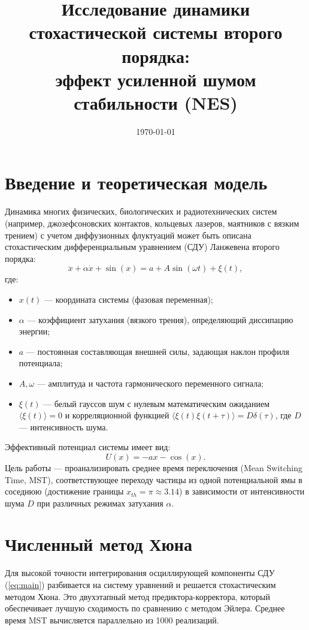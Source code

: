 \documentclass{article}
\title{Исследование динамики стохастической системы второго порядка:\\ эффект усиленной шумом стабильности (NES)}
\date{\today}
\begin{document}
\maketitle

\section{Введение и теоретическая модель}
Динамика многих физических, биологических и радиотехнических систем (например, джозефсоновских контактов, кольцевых лазеров, маятников с вязким трением) с учетом диффузионных флуктуаций может быть описана стохастическим дифференциальным уравнением (СДУ) Ланжевена второго порядка:
\begin{equation}
    \ddot{x} + \alpha \dot{x} + \sin(x) = a + A \sin(\omega t) + \xi(t),
    \label{eq:main}
\end{equation}
где:
\begin{itemize}
    \item $x(t)$ — координата системы (фазовая переменная);
    \item $\alpha$ — коэффициент затухания (вязкого трения), определяющий диссипацию энергии;
    \item $a$ — постоянная составляющая внешней силы, задающая наклон профиля потенциала;
    \item $A, \omega$ — амплитуда и частота гармонического переменного сигнала;
    \item $\xi(t)$ — белый гауссов шум с нулевым математическим ожиданием $\langle \xi(t) \rangle = 0$ и корреляционной функцией $\langle \xi(t)\xi(t+\tau) \rangle = D \delta(\tau)$, где $D$ — интенсивность шума.
\end{itemize}

Эффективный потенциал системы имеет вид:
\begin{equation}
    U(x) = -a x - \cos(x).
\end{equation}
Цель работы — проанализировать среднее время переключения (Mean Switching Time, MST), соответствующее переходу частицы из одной потенциальной ямы в соседнюю (достижение границы $x_{th} = \pi \approx 3.14$) в зависимости от интенсивности шума $D$ при различных режимах затухания $\alpha$.

\section{Численный метод Хюна}
Для высокой точности интегрирования осциллирующей компоненты СДУ (\ref{eq:main}) разбивается на систему уравнений и решается стохастическим методом Хюна. Это двухэтапный метод предиктора-корректора, который обеспечивает лучшую сходимость по сравнению с методом Эйлера. Среднее время MST вычисляется параллельно из 1000 реализаций.
\end{document}
